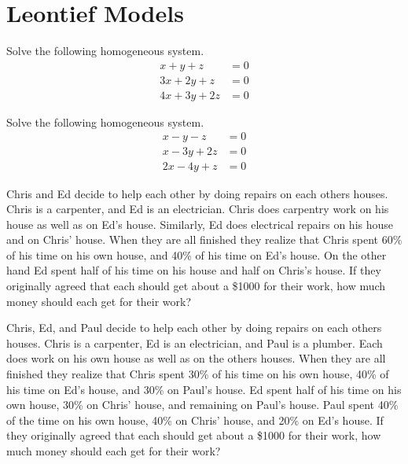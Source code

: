 \section{Leontief Models}

\begin{puzzle}
    Solve the following homogeneous system.
    \[
        \begin{aligned}
            x + y + z    & = 0 \\
            3x + 2y + z  & = 0 \\
            4x + 3y + 2z & = 0
        \end{aligned}
    \]
\end{puzzle}

\begin{puzzle}
    Solve the following homogeneous system.
    \[
        \begin{aligned}
            x - y - z   & = 0 \\
            x - 3y + 2z & = 0 \\
            2x - 4y + z & = 0
        \end{aligned}
    \]
\end{puzzle}


\begin{puzzle}
    Chris and Ed decide to help each other by doing repairs on each others houses. Chris is a carpenter,
    and Ed is an electrician. Chris does carpentry work on his house as well as on Ed's house. Similarly,
    Ed does electrical repairs on his house and on Chris' house. When they are all finished they realize
    that Chris spent 60\% of his time on his own house, and 40\% of his time on Ed's house. On the
    other hand Ed spent half of his time on his house and half on Chris's house. If they originally
    agreed that each should get about a \$1000 for their work, how much money should each get for
    their work?
\end{puzzle}
\begin{puzzle}
    Chris, Ed, and Paul decide to help each other by doing repairs on each others houses. Chris is a
    carpenter, Ed is an electrician, and Paul is a plumber. Each does work on his own house as well as
    on the others houses. When they are all finished they realize that Chris spent 30\% of his time on
    his own house, 40\% of his time on Ed's house, and 30\% on Paul's house. Ed spent half of his time
    on his own house, 30\% on Chris' house, and remaining on Paul's house. Paul spent 40\% of the time
    on his own house, 40\% on Chris' house, and 20\% on Ed's house. If they originally agreed that each
    should get about a \$1000 for their work, how much money should each get for their work?
\end{puzzle}

